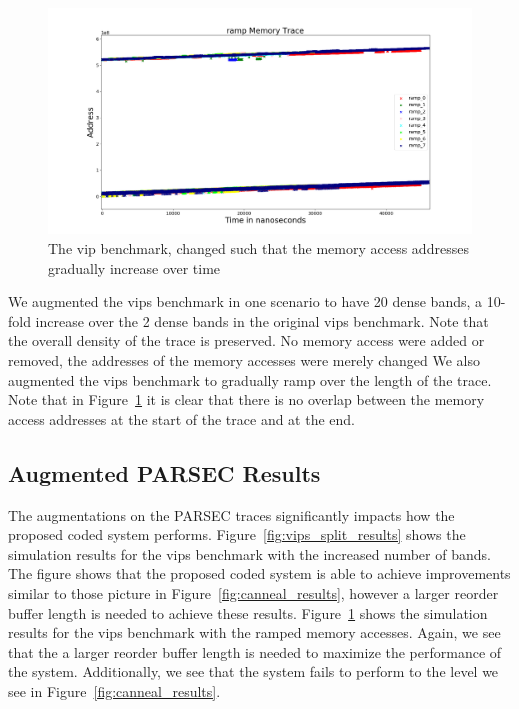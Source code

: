 \begin{figure}[h!]
		\includegraphics[width=\linewidth]{figures/vips_ramp.png}
		\caption{The vip benchmark, changed such that the memory access addresses gradually increase over time}
		\label{fig:vips_ramp}
\end{figure}

We augmented the vips benchmark in one scenario to have 20 dense bands, a 10-fold increase over the 2 dense bands in the original vips benchmark. Note that the overall density of the trace is preserved. No memory access were added or removed, the addresses of the memory accesses were merely changed We also augmented the vips benchmark to gradually ramp over the length of the trace. Note that in Figure~\ref{fig:vips_ramp} it is clear that there is no overlap between the memory access addresses at the start of the trace and at the end.

\subsection{Augmented PARSEC Results}
\label{sec:aug_results}

The augmentations on the PARSEC traces significantly impacts how the proposed coded system performs. Figure~\ref{fig:vips_split_results} shows the simulation results for the vips benchmark with the increased number of bands. The figure shows that the proposed coded system is able to achieve improvements similar to those picture in Figure~\ref{fig:canneal_results}, however a larger reorder buffer length is needed to achieve these results. Figure~\ref{fig:vips_ramp} shows the simulation results for the vips benchmark with the ramped memory accesses. Again, we see that the a larger reorder buffer length is needed to maximize the performance of the system. Additionally, we see that the system fails to perform to the level we see in Figure~\ref{fig:canneal_results}.

